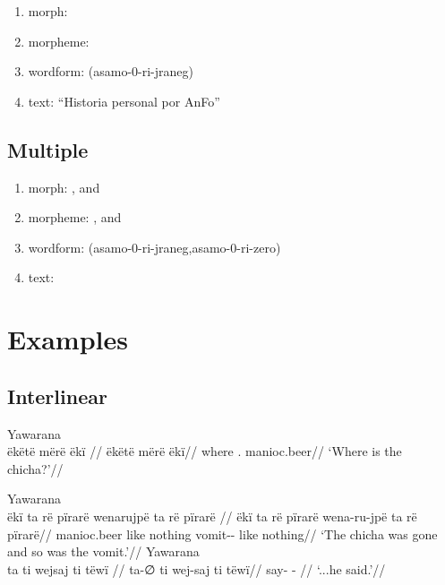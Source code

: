 \documentclass{memoir}
\begin{document}
\begin{enumerate}
\def\labelenumi{\arabic{enumi}.}
\tightlist
\item
  morph: 
\item
  morpheme: 
\item
  wordform: (asamo-0-ri-jraneg)
\item
  text: ``Historia personal por AnFo''
\end{enumerate}

\subsection{Multiple}

\begin{enumerate}
\def\labelenumi{\arabic{enumi}.}
\tightlist
\item
  morph: , and 
\item
  morpheme: , and 
\item
  wordform: (asamo-0-ri-jraneg,asamo-0-ri-zero)
\item
  text:
\end{enumerate}

\section{Examples}

\subsection{Interlinear}

\ex Yawarana \\
\label{ctorat-34}    \begingl
    \glpreamble  ëkëtë mërë ëkï //
    \gla ëkëtë mërë ëkï//
    \glb where . manioc.beer//
        \glft ‘Where is the chicha?’//  
    \endgl 
\xe

\pex\label{}    \a Yawarana\\
    \label{ctorat-35}        \begingl
        \glpreamble  ëkï ta rë pïrarë wenarujpë ta rë pïrarë //
        \gla ëkï ta rë pïrarë wena-ru-jpë ta rë pïrarë//
        \glb manioc.beer like  nothing vomit-- like  nothing//
            \glft ‘The chicha was gone and so was the vomit.’//  
        \endgl 
    \a Yawarana\\
    \label{ctorat-36}        \begingl
        \glpreamble  ta ti wejsaj ti tëwï //
        \gla ta-∅ ti wej-saj ti tëwï//
        \glb say-  -  //
            \glft ‘...he said.’//  
        \endgl 
\xe
\end{document}
